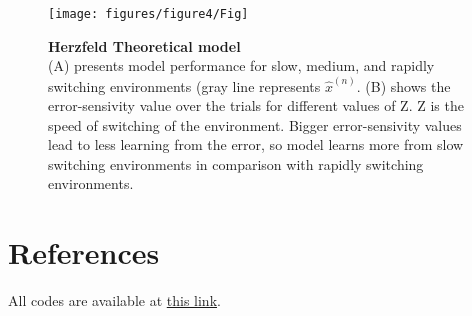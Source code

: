 \documentclass[9pt,twocolumn]{paper-template}
\begin{document}
\begin{figure}[h!]
  \centering
    \texttt{[image: figures/figure4/Fig]}
  \caption{\textbf{Herzfeld Theoretical model}\\
  {(A)} presents model performance for slow, medium, and rapidly switching environments (gray line represents $\hat{x}^{(n)}$. {(B)} shows the error-sensivity value over the trials for different values of Z. Z is the speed of switching of the environment. Bigger error-sensivity values lead to less learning from the error, so model learns more from slow switching environments in comparison with rapidly switching environments.
}
  \label{fig:herzfeld}
\end{figure}















\newpage


\showacknow{} %

\section*{References}


\bigskip
\begin{center}
All codes are available at \href{https://github.com/MohammadAminAlamalhoda/Motor-Learning}{this link}.
\end{center}
\end{document}
